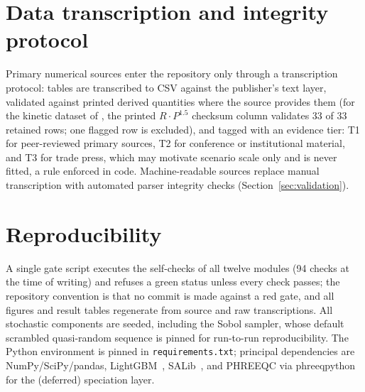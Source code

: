 \documentclass[review,number,sort&compress]{elsarticle}
\begin{document}
\appendix
\section{Data transcription and integrity protocol}\label{app:protocol}
Primary numerical sources enter the repository only through a
transcription protocol: tables are transcribed to CSV against the
publisher's text layer, validated against printed derived quantities
where the source provides them (for the kinetic dataset of
\citet{rothbaum1979rohde}, the printed $R \cdot P^{1.5}$ checksum column
validates 33 of 33 retained rows; one flagged row is excluded), and
tagged with an evidence tier: T1 for peer-reviewed primary sources, T2
for conference or institutional material, and T3 for trade press, which
may motivate scenario scale only and is never fitted, a rule enforced
in code. Machine-readable sources
replace manual transcription with automated parser integrity checks
(Section~\ref{sec:validation}).

\section{Reproducibility}\label{app:repro}
A single gate script executes the self-checks of all twelve modules
(94 checks at the time of writing) and refuses a green status unless
every check passes; the repository convention is that no commit is made
against a red gate, and all figures and result tables regenerate from
source and raw transcriptions. All stochastic components are seeded,
including the Sobol sampler, whose default scrambled quasi-random
sequence is pinned for run-to-run reproducibility. The Python
environment is pinned in \texttt{requirements.txt}; principal
dependencies are NumPy/SciPy/pandas, LightGBM~\citep{ke2017lightgbm},
SALib~\citep{herman2017salib}, and PHREEQC via
phreeqpython~\citep{parkhurst2013phreeqc} for the (deferred) speciation
layer.
\end{document}
